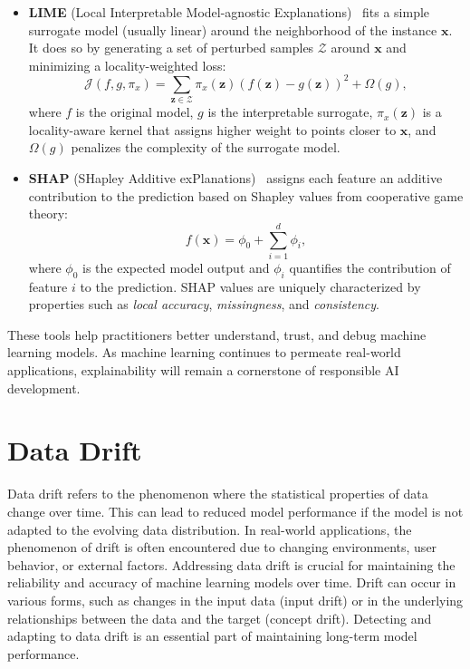 \begin{itemize}
    \item \textbf{LIME} (Local Interpretable Model-agnostic Explanations)~\cite{lime} fits a
          simple surrogate model (usually linear) around the neighborhood of the instance $\mathbf{x}$. It does so by generating a set of perturbed samples $\mathcal{Z}$ around $\mathbf{x}$ and minimizing a locality-weighted loss:
          \begin{equation}
              \mathcal{J}(f, g, \pi_x) = \sum_{\mathbf{z} \in \mathcal{Z}} \pi_x(\mathbf{z}) (f(\mathbf{z}) - g(\mathbf{z}))^2 + \Omega(g),
          \end{equation}
          where $f$ is the original model, $g$ is the interpretable surrogate, $\pi_x(\mathbf{z})$
          is a locality-aware kernel that assigns higher weight to points closer to $\mathbf{x}$, and $\Omega(g)$ penalizes the complexity of the surrogate model.

    \item \textbf{SHAP} (SHapley Additive exPlanations)~\cite{shap} assigns each feature an
          additive contribution to the prediction based on Shapley values from cooperative game theory:
          \begin{equation}
              f(\mathbf{x}) = \phi_0 + \sum_{i=1}^{d} \phi_i,
          \end{equation}
          where $\phi_0$ is the expected model output and $\phi_i$ quantifies the
          contribution of feature $i$ to the prediction. SHAP values are uniquely
          characterized by properties such as \emph{local accuracy},
          \emph{missingness}, and \emph{consistency}.
\end{itemize}

These tools help practitioners better understand, trust, and debug machine
learning models. As machine learning continues to permeate real-world
applications, explainability will remain a cornerstone of responsible AI
development.

\section{Data Drift}\label{sec:data_drift}
Data drift refers to the phenomenon where the statistical properties of data
change over time. This can lead to reduced model performance if the model is
not adapted to the evolving data distribution. In real-world applications, the
phenomenon of drift is often encountered due to changing environments, user
behavior, or external factors. Addressing data drift is crucial for maintaining
the reliability and accuracy of machine learning models over time. Drift can
occur in various forms, such as changes in the input data (input drift) or in
the underlying relationships between the data and the target (concept drift).
Detecting and adapting to data drift is an essential part of maintaining
long-term model performance.


